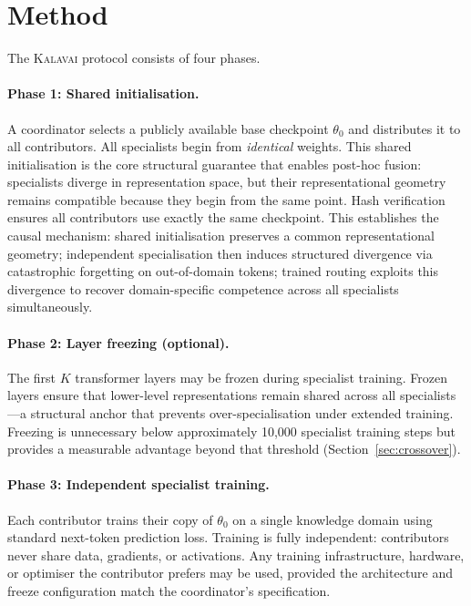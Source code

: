 \documentclass{article}
\newcommand{\kalavai}{\textsc{Kalavai}\xspace}
\begin{document}
\section{Method}
\label{sec:method}

The \kalavai protocol consists of four phases.

\paragraph{Phase 1: Shared initialisation.} A coordinator selects a publicly available base checkpoint $\theta_0$ and distributes it to all contributors. All specialists begin from \emph{identical} weights. This shared initialisation is the core structural guarantee that enables post-hoc fusion: specialists diverge in representation space, but their representational geometry remains compatible because they begin from the same point. Hash verification ensures all contributors use exactly the same checkpoint. This establishes the causal mechanism: shared initialisation preserves a common representational geometry; independent specialisation then induces structured divergence via catastrophic forgetting on out-of-domain tokens; trained routing exploits this divergence to recover domain-specific competence across all specialists simultaneously.

\paragraph{Phase 2: Layer freezing (optional).} The first $K$ transformer layers may be frozen during specialist training. Frozen layers ensure that lower-level representations remain shared across all specialists---a structural anchor that prevents over-specialisation under extended training. Freezing is unnecessary below approximately 10,000 specialist training steps but provides a measurable advantage beyond that threshold (Section~\ref{sec:crossover}).

\paragraph{Phase 3: Independent specialist training.} Each contributor trains their copy of $\theta_0$ on a single knowledge domain using standard next-token prediction loss. Training is fully independent: contributors never share data, gradients, or activations. Any training infrastructure, hardware, or optimiser the contributor prefers may be used, provided the architecture and freeze configuration match the coordinator's specification.
\end{document}
